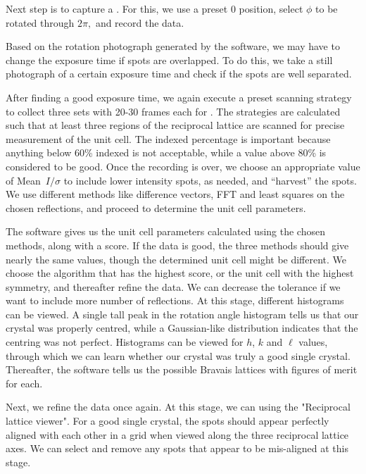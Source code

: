 Next step is to capture a . For this, we use a preset 0 position, select $\phi$ to be rotated through $2\pi,$ and record the data.

Based on the rotation photograph generated by the software, we may have to change the exposure time if spots are overlapped. To do this, we take a still photograph of a certain exposure time and check if the spots are well separated.

After finding a good exposure time, we again execute a preset scanning strategy to collect three sets with 20-30 frames each for . The strategies are calculated such that at least three regions of the reciprocal lattice are scanned for precise measurement of the unit cell. The indexed percentage is important because anything below 60\% indexed is not acceptable, while a value above 80\% is considered to be good. Once the recording is over, we choose an appropriate value of Mean~$I/\sigma$ to include lower intensity spots, as needed, and ``harvest'' the spots. We use different methods like difference vectors, FFT and least squares on the chosen reflections, and proceed to determine the unit cell parameters.

The software gives us the unit cell parameters calculated using the chosen methods, along with a score. If the data is good, the three methods should give nearly the same values, though the determined unit cell might be different. We choose the algorithm that has the highest score, or the unit cell with the highest symmetry, and thereafter refine the data. We can decrease the tolerance if we want to include more number of reflections. At this stage, different histograms can be viewed. A single tall peak in the rotation angle histogram tells us that our crystal was properly centred, while a Gaussian-like distribution indicates that the centring was not perfect. Histograms can be viewed for $h$, $k$ and $\ell$ values, through which we can learn whether our crystal was truly a good single crystal. Thereafter, the software tells us the possible Bravais lattices with figures of merit for each.

Next, we refine the data once again. At this stage, we can  using the "Reciprocal lattice viewer". For a good single crystal, the spots should appear perfectly aligned with each other in a grid when viewed along the three reciprocal lattice axes. We can select and remove any spots that appear to be mis-aligned at this stage.

